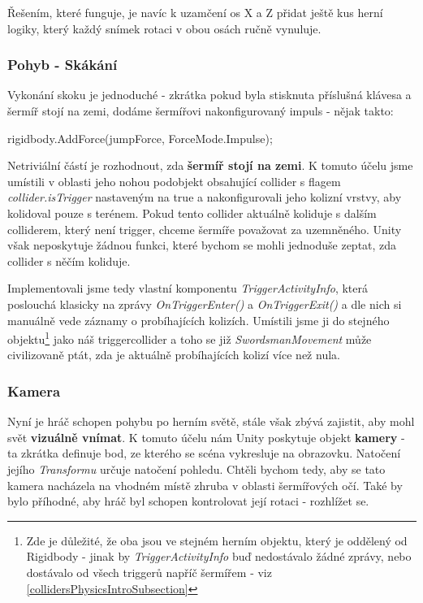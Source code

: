 Řešením, které funguje, je navíc k uzamčení os X a Z přidat ještě kus herní logiky, který každý snímek rotaci v obou osách ručně vynuluje.

\subsubsection*{Pohyb - Skákání}

Vykonání skoku je jednoduché - zkrátka pokud byla stisknuta příslušná klávesa a šermíř stojí na zemi, dodáme šermířovi nakonfigurovaný impuls - nějak takto:

\begin{code}
 rigidbody.AddForce(jumpForce, ForceMode.Impulse);
\end{code}

Netriviální částí je rozhodnout, zda \textbf{šermíř stojí na zemi}. K tomuto účelu jsme umístili v oblasti jeho nohou podobjekt obsahující collider s flagem \textit{collider.isTrigger} nastaveným na true a nakonfigurovali jeho kolizní vrstvy, aby kolidoval pouze s terénem. Pokud tento collider aktuálně koliduje s dalším colliderem, který není trigger, chceme šermíře považovat za uzemněného. Unity však neposkytuje žádnou funkci, které bychom se mohli jednoduše zeptat, zda collider s něčím koliduje. 

Implementovali jsme tedy vlastní komponentu \textit{TriggerActivityInfo}, která poslouchá klasicky na zprávy \textit{OnTriggerEnter()} a \textit{OnTriggerExit()} a dle nich si manuálně vede záznamy o probíhajících kolizích. Umístili jsme ji do stejného objektu\footnote{Zde je důležité, že oba jsou ve stejném herním objektu, který je oddělený od Rigidbody - jinak by \textit{TriggerActivityInfo} buď nedostávalo žádné zprávy, nebo dostávalo od všech triggerů napříč šermířem - viz \ref{collidersPhysicsIntroSubsection}} jako náš triggercollider a toho se již \textit{SwordsmanMovement} může civilizovaně ptát, zda je aktuálně probíhajících kolizí více než nula.

\subsubsection*{Kamera}

Nyní je hráč schopen pohybu po herním světě, stále však zbývá zajistit, aby mohl svět \textbf{vizuálně vnímat}. K tomuto účelu nám Unity poskytuje objekt \textbf{kamery} - ta zkrátka definuje bod, ze kterého se scéna vykresluje na obrazovku. Natočení jejího \textit{Transformu} určuje natočení pohledu. Chtěli bychom tedy, aby se tato kamera nacházela na vhodném místě zhruba v oblasti šermířových očí. Také by bylo příhodné, aby hráč byl schopen kontrolovat její rotaci - rozhlížet se.

